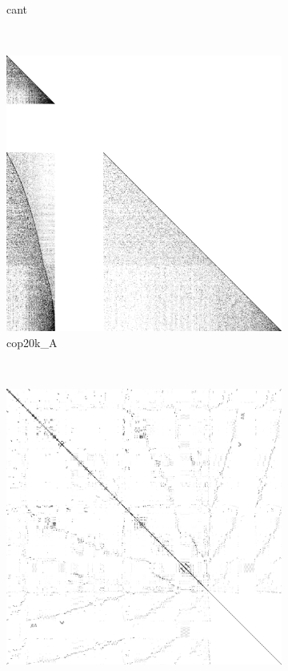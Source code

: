 \begin{figure}
\begin{multicols}{3}
\begin{subfigure}{\linewidth}
\caption{cant}
\end{subfigure}~%
\end{multicols}
\begin{multicols}{3}
\begin{subfigure}{\linewidth}
\includegraphics[width=\linewidth]{images/cop20k_A}
\caption{cop20k\_A}
\end{subfigure}~%
\begin{subfigure}{\linewidth}
\includegraphics[width=\linewidth]{images/scircuit}

\end{subfigure}
\end{multicols}
\end{figure}
